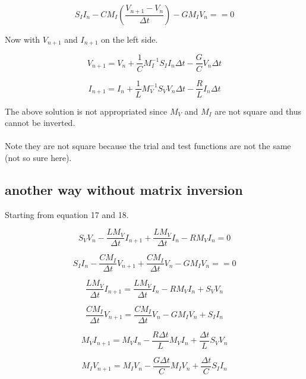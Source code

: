 \documentclass[12pt, letterpaper]{article}
\begin{document}
\begin{equation}
	S_I I_n - C M_I (\frac{V_{n+1}-V_n}{\Delta t}) - G M_I V_n = 
	= 0
\end{equation}


Now with $V_{n+1}$ and $I_{n+1}$ on the left side.

\begin{equation}
	V_{n+1} = V_n + \frac{1}{C} M_I^{-1} S_I I_n \Delta t - \frac{G}{C} V_n \Delta t
\end{equation}

\begin{equation}
	I_{n+1} =  I_n + \frac{1}{L} M_V^{-1} S_V V_n \Delta t - \frac{R}{L} I_n \Delta t
\end{equation}

The above solution is not appropriated since $M_V$ and $M_I$ are not square and thus cannot be inverted.
\\
\\
Note they are not square because the trial and test functions are not the same (not so sure here).


\subsection{another way without matrix inversion}
Starting from equation 17 and 18.

\begin{equation}
	S_V V_n - \frac{L M_V}{\Delta t} I_{n+1} + \frac{L M_V}{\Delta t} I_n - R M_V I_n
	= 0
\end{equation}

\begin{equation}
	S_I I_n - \frac{C M_I}{\Delta t} V_{n+1} + \frac{C M_I}{\Delta t} V_n - G M_I V_n = 
	= 0
\end{equation}

\begin{equation}
	\frac{L M_V}{\Delta t} I_{n+1} = \frac{L M_V}{\Delta t} I_n - R M_V I_n + S_V V_n
\end{equation}

\begin{equation}
	\frac{C M_I}{\Delta t} V_{n+1}
	= \frac{C M_I}{\Delta t} V_n - G M_I V_n + S_I I_n 
\end{equation}

\begin{equation}
	M_V I_{n+1} = M_V I_n - \frac{R \Delta t}{L} M_V I_n + \frac{\Delta t}{L} S_V V_n
\end{equation}

\begin{equation}
	M_I V_{n+1}
	= M_I V_n - \frac{G \Delta t}{C} M_I V_n + \frac{\Delta t}{C} S_I I_n 
\end{equation}
\end{document}
